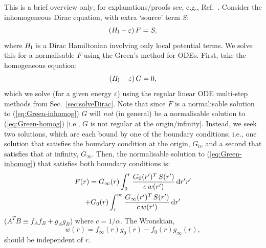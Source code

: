 \documentclass[10pt,twocolumn,a4paper]{article}%
\newcommand{\be}{\begin{equation}}
\newcommand{\ee}{\end{equation}}
\def\d{\ensuremath{{\rm d}}}
\def\en{\ensuremath{\varepsilon}}
\begin{document}
This is a brief overview only; for explanations/proofs see, e.g., Ref.~\cite{Arfken2013}.
Consider the inhomogeneous Dirac equation, with extra `source' term $S$:
\be\label{eq:Green-inhomog}
\left( H_{\rm l}- \en\right)F = S,
\ee
where $H_{\rm l}$ is a Dirac Hamiltonian involving only local potential terms.
We solve this for a normalisable $F$ using the Green's method for ODEs.
First, take the homogeneous equation:
\be\label{eq:Green-homog}
\left( H_{\rm l}- \en\right) G = 0,
\ee
which we solve (for a given energy $\en$) using the regular linear ODE multi-step methods from Sec.~\ref{sec:solveDirac}.
Note that since $F$ is a normalisable solution to (\ref{eq:Green-inhomog}) $G$ will {\em not} (in general) be a normalisable solution to (\ref{eq:Green-homog}) [i.e., $G$ is not regular at the origin/infinity].
Instead, we seek two solutions, which are each bound by one of the boundary conditions; i.e., one solution that satisfies the boundary condition at the origin, $G_0$, and a second that satisfies that at infinity, $G_\infty$.
Then, the normalisable solution to (\ref{eq:Green-inhomog}) that satisfies both boundary conditions is:
\begin{multline}\label{eq:GreensSolution}
F(r) = G_\infty(r) \int_0^r \frac{G_0(r')^T \, S(r')}{c\,w(r')}\,\d r'r'
\\
+  G_0(r) \int_r^\infty \frac{G_\infty(r')^T \, S(r')}{c\,w(r')}\,\d r'
\end{multline}
($A^T B \equiv f_A f_B + g_A g_B$)
where $c=1/\alpha$. 
The Wronskian,
\be\label{eq:Green-Wronskian}
w(r) = f_\infty(r) g_0(r) - f_0(r)g_\infty(r),
\ee
should be independent of $r$.
\end{document}

